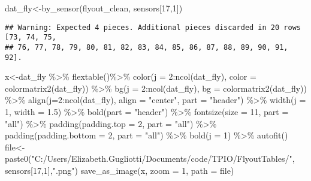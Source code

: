 \documentclass[
]{article}
\newenvironment{Shaded}{\begin{snugshade}}{\end{snugshade}}
\newcommand{\AttributeTok}[1]{\textcolor[rgb]{0.77,0.63,0.00}{#1}}
\newcommand{\DecValTok}[1]{\textcolor[rgb]{0.00,0.00,0.81}{#1}}
\newcommand{\FloatTok}[1]{\textcolor[rgb]{0.00,0.00,0.81}{#1}}
\newcommand{\FunctionTok}[1]{\textcolor[rgb]{0.00,0.00,0.00}{#1}}
\newcommand{\NormalTok}[1]{#1}
\newcommand{\OtherTok}[1]{\textcolor[rgb]{0.56,0.35,0.01}{#1}}
\newcommand{\SpecialCharTok}[1]{\textcolor[rgb]{0.00,0.00,0.00}{#1}}
\newcommand{\StringTok}[1]{\textcolor[rgb]{0.31,0.60,0.02}{#1}}
\begin{document}
\begin{Shaded}
\begin{Highlighting}[]
\NormalTok{dat\_fly}\OtherTok{\textless{}{-}}\FunctionTok{by\_sensor}\NormalTok{(flyout\_clean, sensors[}\DecValTok{17}\NormalTok{,}\DecValTok{1}\NormalTok{])}
\end{Highlighting}
\end{Shaded}

\begin{verbatim}
## Warning: Expected 4 pieces. Additional pieces discarded in 20 rows [73, 74, 75,
## 76, 77, 78, 79, 80, 81, 82, 83, 84, 85, 86, 87, 88, 89, 90, 91, 92].
\end{verbatim}

\begin{Shaded}
\begin{Highlighting}[]
\NormalTok{x}\OtherTok{\textless{}{-}}\NormalTok{dat\_fly }\SpecialCharTok{\%\textgreater{}\%}
    \FunctionTok{flextable}\NormalTok{()}\SpecialCharTok{\%\textgreater{}\%}
    \FunctionTok{color}\NormalTok{(}\AttributeTok{j =} \DecValTok{2}\SpecialCharTok{:}\FunctionTok{ncol}\NormalTok{(dat\_fly), }\AttributeTok{color =} \FunctionTok{colormatrix2}\NormalTok{(dat\_fly)) }\SpecialCharTok{\%\textgreater{}\%}
    \FunctionTok{bg}\NormalTok{(}\AttributeTok{j =} \DecValTok{2}\SpecialCharTok{:}\FunctionTok{ncol}\NormalTok{(dat\_fly), }\AttributeTok{bg =} \FunctionTok{colormatrix2}\NormalTok{(dat\_fly)) }\SpecialCharTok{\%\textgreater{}\%}
    \FunctionTok{align}\NormalTok{(}\AttributeTok{j=}\DecValTok{2}\SpecialCharTok{:}\FunctionTok{ncol}\NormalTok{(dat\_fly), }\AttributeTok{align =} \StringTok{"center"}\NormalTok{, }\AttributeTok{part =} \StringTok{"header"}\NormalTok{) }\SpecialCharTok{\%\textgreater{}\%}
    \FunctionTok{width}\NormalTok{(}\AttributeTok{j =} \DecValTok{1}\NormalTok{, }\AttributeTok{width =} \FloatTok{1.5}\NormalTok{) }\SpecialCharTok{\%\textgreater{}\%}
    \FunctionTok{bold}\NormalTok{(}\AttributeTok{part =} \StringTok{"header"}\NormalTok{) }\SpecialCharTok{\%\textgreater{}\%}
    \FunctionTok{fontsize}\NormalTok{(}\AttributeTok{size =} \DecValTok{11}\NormalTok{, }\AttributeTok{part =} \StringTok{"all"}\NormalTok{) }\SpecialCharTok{\%\textgreater{}\%}
    \FunctionTok{padding}\NormalTok{(}\AttributeTok{padding.top =} \DecValTok{2}\NormalTok{, }\AttributeTok{part =} \StringTok{"all"}\NormalTok{) }\SpecialCharTok{\%\textgreater{}\%}
    \FunctionTok{padding}\NormalTok{(}\AttributeTok{padding.bottom =} \DecValTok{2}\NormalTok{, }\AttributeTok{part =} \StringTok{"all"}\NormalTok{) }\SpecialCharTok{\%\textgreater{}\%}
    \FunctionTok{bold}\NormalTok{(}\AttributeTok{j =} \DecValTok{1}\NormalTok{) }\SpecialCharTok{\%\textgreater{}\%} \FunctionTok{autofit}\NormalTok{()}
\NormalTok{file}\OtherTok{\textless{}{-}}\FunctionTok{paste0}\NormalTok{(}\StringTok{"C:/Users/Elizabeth.Gugliotti/Documents/code/TPIO/FlyoutTables/"}\NormalTok{, sensors[}\DecValTok{17}\NormalTok{,}\DecValTok{1}\NormalTok{],}\StringTok{".png"}\NormalTok{)}
\FunctionTok{save\_as\_image}\NormalTok{(x, }\AttributeTok{zoom =} \DecValTok{1}\NormalTok{, }\AttributeTok{path =}\NormalTok{ file)}
\end{Highlighting}
\end{Shaded}
\end{document}
